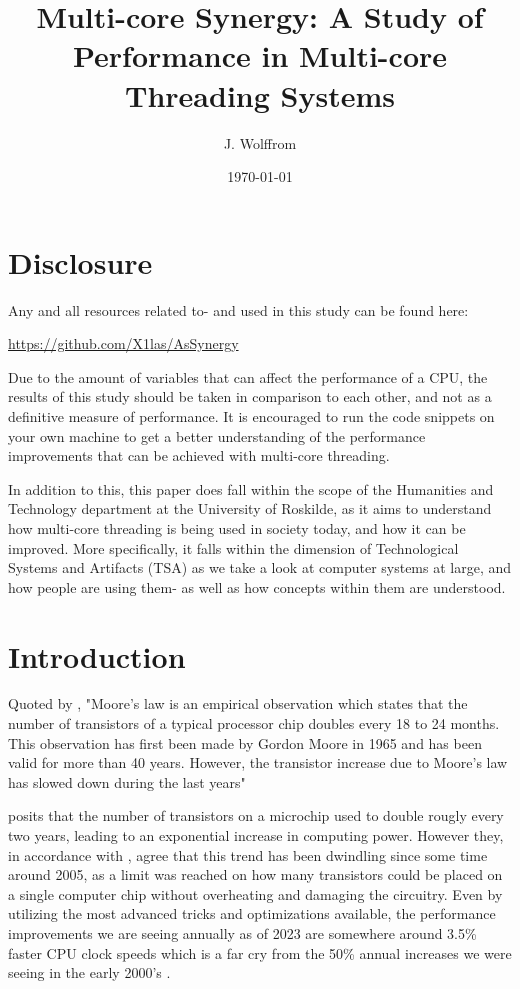 \documentclass[12pt,a4paper]{article}
\title{Multi-core Synergy: A Study of Performance in Multi-core Threading Systems}
\author{J. Wolffrom}
\date{\today}
\begin{document}
\maketitle
\newpage

\begin{abstract}

\end{abstract}
\newpage

\tableofcontents
\newpage

\section{Disclosure}

Any and all resources related to- and used in this study can be found here:

\href{https://github.com/X1las/AsSynergy}{https://github.com/X1las/AsSynergy}

Due to the amount of variables that can affect the performance of a CPU, the results of this study should be taken in comparison to each other, and not as a definitive measure of performance. It is encouraged to run the code snippets on your own machine to get a better understanding of the performance improvements that can be achieved with multi-core threading.

In addition to this, this paper does fall within the scope of the Humanities and Technology department at the University of Roskilde, as it aims to understand how multi-core threading is being used in society today, and how it can be improved. More specifically, it falls within the dimension of Technological Systems and Artifacts (TSA) as we take a look at computer systems at large, and how people are using them- as well as how concepts within them are understood.

\section{Introduction}

Quoted by \cite{Rauber2023}, "Moore’s law is an empirical
observation which states that the number of transistors of a typical processor chip
doubles every 18 to 24 months. This observation has first been made by Gordon
Moore in 1965 and has been valid for more than 40 years. However, the transistor
increase due to Moore’s law has slowed down during the last years" 

\citeauthor{Rauber2023} posits that the number of transistors on a microchip used to double rougly every two years, leading to an exponential increase in computing power. However they, in accordance with \cite{Mattson2014}, agree that this trend has been dwindling since some time around 2005, as a limit was reached on how many transistors could be placed on a single computer chip without overheating and damaging the circuitry. Even by utilizing the most advanced tricks and optimizations available, the performance improvements we are seeing annually as of 2023 are somewhere around 3.5\% faster CPU clock speeds \parencite[p. 11]{Rauber2023} which is a far cry from the 50\% annual increases we were seeing in the early 2000's \parencite[p. 11]{Rauber2023}. 
\end{document}
